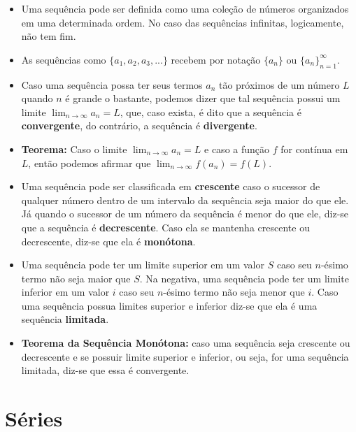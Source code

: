 		\begin{itemize}
			
			\item Uma sequência pode ser definida como uma coleção de números organizados em uma determinada ordem. No caso das sequências infinitas, logicamente, não tem fim.
			
			\item As sequências como $\{a_{1}, a_{2}, a_{3}, ...\}$ recebem por notação
			$\{a_{n}\}$  ou  $\{a_{n}\}^{\infty}_{n = 1}$.
			
			\item Caso uma sequência possa ter seus termos $a_{n}$ tão próximos de um número $L$ quando $n$ é grande o bastante, podemos dizer que tal sequência possui um limite $\lim_{n\rightarrow \infty} a_{n} = L$, que, caso exista, é dito que a sequência é \textbf{convergente}, do contrário, a sequência é \textbf{divergente}.
			
			\item \textbf{Teorema: }Caso o limite $\lim_{n\rightarrow \infty} a_{n} = L$ e caso a função $f$ for contínua em $L$, então podemos afirmar que $\lim_{n\rightarrow  \infty} f(a_{n}) = {f(L)}$.
			
			\item Uma sequência pode ser classificada em \textbf{crescente} caso o sucessor de qualquer número dentro de um intervalo da sequência seja maior do que ele. Já quando o sucessor de um número da sequência é menor do que ele, diz-se que a sequência é \textbf{decrescente}. Caso ela se mantenha crescente ou decrescente, diz-se que ela é \textbf{monótona}.
			
			\item Uma sequência pode ter um limite superior em um valor $S$ caso seu $n$-ésimo termo não seja maior que $S$. Na negativa, uma sequência pode ter um limite inferior em um valor $i$ caso seu $n$-ésimo termo não seja menor que $i$. Caso uma sequência possua limites superior e inferior diz-se que ela é uma sequência \textbf{limitada}.
			
			\item \textbf{Teorema da Sequência Monótona: }caso uma sequência seja crescente ou decrescente e se possuir limite superior e inferior, ou seja, for uma sequência limitada, diz-se que essa é convergente.
				
		\end{itemize}
	
	\section{Séries}
		

